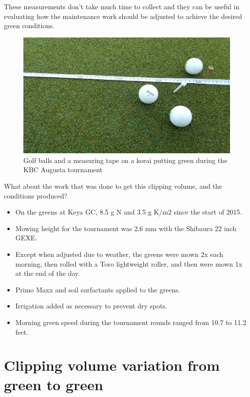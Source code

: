 \documentclass[12pt,b5,]{tufte-book}
\providecommand{\tightlist}{%
  \setlength{\itemsep}{0pt}\setlength{\parskip}{0pt}}
\begin{document}
These measurements don't take much time to collect and they can be useful in evaluating how the maintenance work should be adjusted to achieve the desired green conditions.

\begin{figure}
\centering
\includegraphics{img/b4-8.jpg}
\caption{Golf balls and a measuring tape on a korai putting green during the KBC Augusta tournament}
\end{figure}

What about the work that was done to get this clipping volume, and the conditions produced?

\begin{itemize}
\tightlist
\item
  On the greens at Keya GC, 8.5 g N and 3.5 g K/m2 since the start of 2015.
\item
  Mowing height for the tournament was 2.6 mm with the Shibaura 22 inch GEXE.
\item
  Except when adjusted due to weather, the greens were mown 2x each morning, then rolled with a Toro lightweight roller, and then were mown 1x at the end of the day.
\item
  Primo Maxx and soil surfactants applied to the greens.
\item
  Irrigation added as necessary to prevent dry spots.
\item
  Morning green speed during the tournament rounds ranged from 10.7 to 11.2 feet.
\end{itemize}

\hypertarget{clipping-volume-variation-from-green-to-green}{%
\chapter{Clipping volume variation from green to green}\label{clipping-volume-variation-from-green-to-green}}
\end{document}
